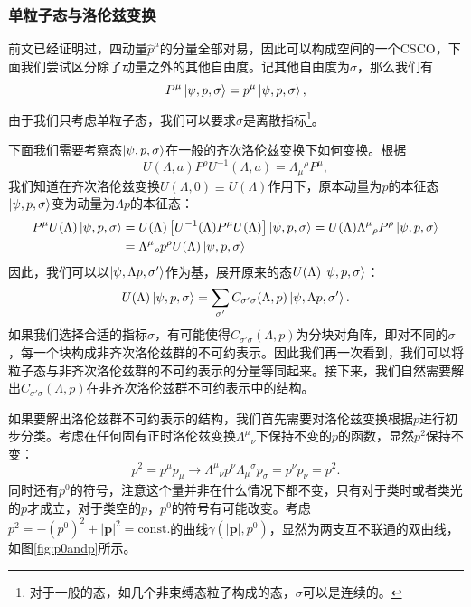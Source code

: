 \subsubsection{单粒子态与洛伦兹变换}
前文已经证明过，四动量$\hat{p}^{\mu }$的分量全部对易，因此可以构成空间的一个CSCO，下面我们尝试区分除了动量之外的其他自由度。记其他自由度为$\sigma $，那么我们有
\begin{equation*}
	P^{\mu }\ket{\psi ,p,\sigma } =p^{\mu }\ket{\psi ,p,\sigma } ,
\end{equation*}
由于我们只考虑单粒子态，我们可以要求$\sigma $是离散指标\footnote{对于一般的态，如几个非束缚态粒子构成的态，$\sigma $可以是连续的。}。 

下面我们需要考察态$\ket{\psi ,p,\sigma }$在一般的齐次洛伦兹变换下如何变换。根据
\begin{equation*}
	U( \Lambda ,a) P^{\rho } U^{-1}( \Lambda ,a) =\Lambda {_{\mu }}^{\rho } P^{\mu } ,
\end{equation*}
我们知道在齐次洛伦兹变换$U( \Lambda ,0) \equiv U( \Lambda )$作用下，原本动量为$p$的本征态$\ket{\psi ,p,\sigma }$变为动量为$\Lambda p$的本征态：
\begin{equation*}
	\begin{aligned}
		P^{\mu } U( \Lambda )\ket{\psi ,p,\sigma } & =U( \Lambda )\left[ U^{-1}( \Lambda ) P^{\mu } U( \Lambda )\right]\ket{\psi ,p,\sigma } =U( \Lambda ) \Lambda ^{\mu }{}_{\rho } P^{\rho }\ket{\psi ,p,\sigma }\\
		& =\Lambda ^{\mu }{}_{\rho } p^{\rho } U( \Lambda )\ket{\psi ,p,\sigma }
	\end{aligned}
\end{equation*}
因此，我们可以以$\ket{\psi ,\Lambda p,\sigma '}$作为基，展开原来的态$U( \Lambda )\ket{\psi ,p,\sigma }$：
\begin{equation*}
	U( \Lambda )\ket{\psi ,p,\sigma } =\sum _{\sigma '} C_{\sigma '\sigma }( \Lambda ,p)\ket{\psi ,\Lambda p,\sigma '} .
\end{equation*}
如果我们选择合适的指标$\sigma $，有可能使得$C_{\sigma '\sigma }( \Lambda ,p)$为分块对角阵，即对不同的$\sigma $，每一个块构成非齐次洛伦兹群的不可约表示。因此我们再一次看到，我们可以将粒子态与非齐次洛伦兹群的不可约表示的分量等同起来。接下来，我们自然需要解出$C_{\sigma '\sigma }( \Lambda ,p)$在非齐次洛伦兹群不可约表示中的结构。



如果要解出洛伦兹群不可约表示的结构，我们首先需要对洛伦兹变换根据$p$进行初步分类。考虑在任何固有正时洛伦兹变换$\Lambda ^{\mu }{}_{\nu }$下保持不变的$p$的函数，显然$p^{2}$保持不变：
\begin{equation*}
	p^{2} =p^{\mu } p_{\mu }\rightarrow \Lambda ^{\mu }{}_{\nu } p^{\nu } \Lambda {_{\mu }}^{\sigma } p_{\sigma } =p^{\nu } p_{\nu } =p^{2} .
\end{equation*}
同时还有$p^{0}$的符号，注意这个量并非在什么情况下都不变，只有对于类时或者类光的$p$才成立，对于类空的$p$，$p^{0}$的符号有可能改变。考虑$p^{2} =-(p^{0} )^{2} +| \boldsymbol{p}| ^{2} =\mathrm{const.}$的曲线$ \gamma (| \boldsymbol{p}| ,p^{0} )$，显然为两支互不联通的双曲线，如图\ref{fig:p0andp}所示。


